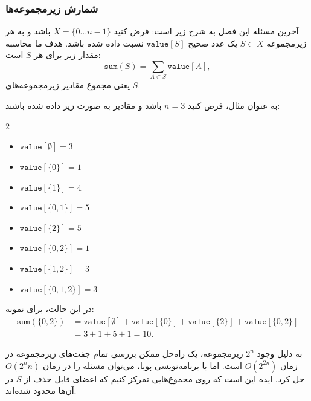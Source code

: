 \subsubsection{شمارش زیرمجموعه‌ها}

آخرین مسئله این فصل به شرح زیر است:
فرض کنید $X=\{0 \ldots n-1\}$ باشد و به هر زیرمجموعه $S \subset X$
یک عدد صحیح $\texttt{value}[S]$ نسبت داده شده باشد.
هدف ما محاسبه مقدار زیر برای هر $S$ است:
\[\texttt{sum}(S) = \sum_{A \subset S} \texttt{value}[A],\]
یعنی مجموع مقادیر زیرمجموعه‌های $S$.

به عنوان مثال، فرض کنید $n=3$ باشد و مقادیر به صورت زیر داده شده باشند:
\begin{multicols}{2}
\begin{itemize}
\item $\texttt{value}[\emptyset] = 3$
\item $\texttt{value}[\{0\}] = 1$
\item $\texttt{value}[\{1\}] = 4$
\item $\texttt{value}[\{0,1\}] = 5$
\item $\texttt{value}[\{2\}] = 5$
\item $\texttt{value}[\{0,2\}] = 1$
\item $\texttt{value}[\{1,2\}] = 3$
\item $\texttt{value}[\{0,1,2\}] = 3$
\end{itemize}
\end{multicols}
در این حالت، برای نمونه:
\begin{equation*}
\begin{split}
\texttt{sum}(\{0,2\}) &= \texttt{value}[\emptyset]+\texttt{value}[\{0\}]+\texttt{value}[\{2\}]+\texttt{value}[\{0,2\}] \\ 
                      &= 3 + 1 + 5 + 1 = 10.
\end{split}
\end{equation*}

به دلیل وجود $2^n$ زیرمجموعه،
یک راه‌حل ممکن بررسی تمام جفت‌های زیرمجموعه در زمان $O(2^{2n})$ است.
اما با برنامه‌نویسی پویا،
می‌توان مسئله را در زمان $O(2^n n)$ حل کرد.
ایده این است که روی مجموع‌هایی تمرکز کنیم که اعضای قابل حذف از $S$ در آن‌ها محدود شده‌اند.

